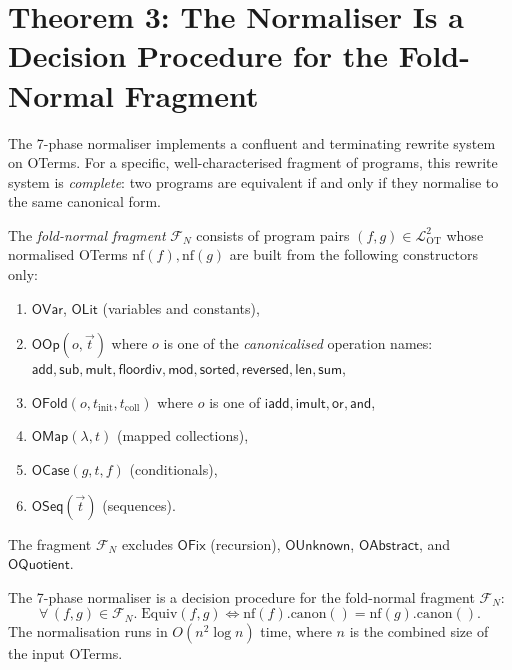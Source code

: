 \section{Theorem 3: The Normaliser Is a Decision Procedure for the
         Fold-Normal Fragment}
\label{sec:thm-normalizer}

The 7-phase normaliser implements a confluent and terminating rewrite
system on OTerms.  For a specific, well-characterised fragment of
programs, this rewrite system is \emph{complete}: two programs are
equivalent if and only if they normalise to the same canonical form.

\begin{definition}
\label{def:fold-normal}
The \emph{fold-normal fragment} $\mathcal{F}_N$ consists of program
pairs $(f, g) \in \mathcal{L}_{\mathrm{OT}}^2$ whose normalised
OTerms $\mathrm{nf}(f), \mathrm{nf}(g)$ are built from the following
constructors only:
\begin{enumerate}[label=(\roman*)]
  \item $\mathsf{OVar}$, $\mathsf{OLit}$ (variables and constants),
  \item $\mathsf{OOp}(o, \vec{t})$ where $o$ is one of the
    \emph{canonicalised} operation names:
    $\mathsf{add}, \mathsf{sub}, \mathsf{mult}, \mathsf{floordiv},
    \mathsf{mod}, \mathsf{sorted}, \mathsf{reversed},
    \mathsf{len}, \mathsf{sum}$,
  \item $\mathsf{OFold}(o, t_{\mathrm{init}}, t_{\mathrm{coll}})$
    where $o$ is one of $\mathsf{iadd}, \mathsf{imult}, \mathsf{or},
    \mathsf{and}$,
  \item $\mathsf{OMap}(\lambda, t)$ (mapped collections),
  \item $\mathsf{OCase}(g, t, f)$ (conditionals),
  \item $\mathsf{OSeq}(\vec{t})$ (sequences).
\end{enumerate}
The fragment $\mathcal{F}_N$ excludes $\mathsf{OFix}$ (recursion),
$\mathsf{OUnknown}$, $\mathsf{OAbstract}$, and $\mathsf{OQuotient}$.
\end{definition}

\begin{theorem}
\label{thm:normalizer-complete}
The 7-phase normaliser is a decision procedure for the fold-normal
fragment $\mathcal{F}_N$:
\[
  \forall\, (f, g) \in \mathcal{F}_N.\;
  \mathrm{Equiv}(f, g)
  \iff
  \mathrm{nf}(f).\mathrm{canon}()
  =
  \mathrm{nf}(g).\mathrm{canon}().
\]
The normalisation runs in $O(n^2 \log n)$ time, where $n$ is the
combined size of the input OTerms.
\end{theorem}

